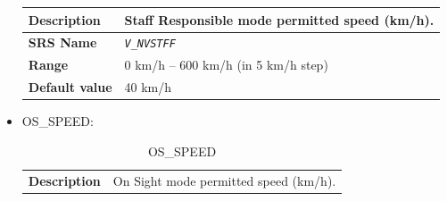 \documentclass{template/openetcs}
\begin{document}
\begin{itemize}
\begin{longtable}{|l|l|}
					\begin{minipage}[t]{0.22\linewidth} \textbf{Description}	\end{minipage} 
				&	\begin{minipage}[t]{0.78\linewidth} Staff Responsible mode permitted speed (km/h). \end{minipage} \\
				
				\hline
				
					\begin{minipage}[t]{0.22\linewidth} \textbf{SRS Name}	\end{minipage} 
				&	\begin{minipage}[t]{0.78\linewidth} \emph{\texttt{V\_NVSTFF}} \end{minipage} \\
				
				\hline
														
					\begin{minipage}[t]{0.22\linewidth} \textbf{Range}	\end{minipage} 
				&	\begin{minipage}[t]{0.78\linewidth} 0 km/h – 600 km/h (in 5 km/h step) \end{minipage} \\
				
				\hline
										
					\begin{minipage}[t]{0.22\linewidth} \textbf{Default value}	\end{minipage} 
				&	\begin{minipage}[t]{0.78\linewidth} 40 km/h \end{minipage} \\
				
				\hline
				
			\end{longtable}
			
			
		\item OS\_SPEED:
		
			\begin{longtable}{|l|l|}
				\caption{OS\_SPEED}\\ 							
				\hline
				
					\begin{minipage}[t]{0.22\linewidth} \textbf{Description}	\end{minipage} 
				&	\begin{minipage}[t]{0.78\linewidth} On Sight mode permitted speed (km/h). \end{minipage} \\
				

\end{longtable}
\end{itemize}
\end{document}
